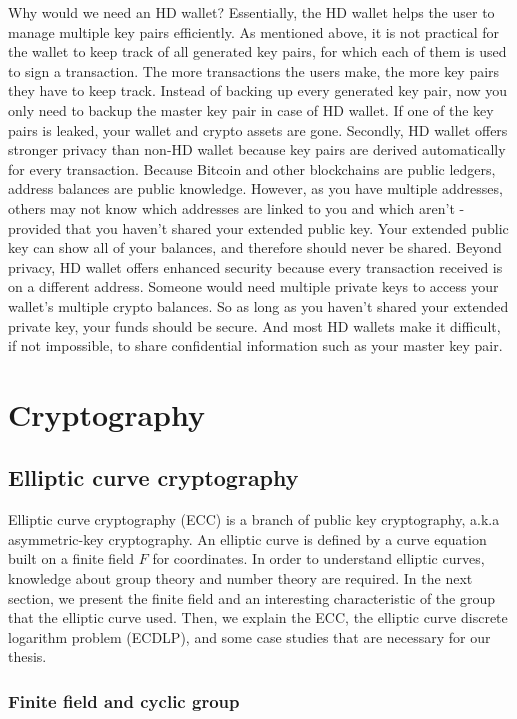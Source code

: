Why would we need an HD wallet? Essentially, the HD wallet helps the user to manage multiple key pairs efficiently. As mentioned above, it is not practical for the wallet to keep track of all generated key pairs, for which each of them is used to sign a transaction. The more transactions the users make, the more key pairs they have to keep track. Instead of backing up every generated key pair, now you only need to backup the master key pair in case of HD wallet. If one of the key pairs is leaked, your wallet and crypto assets are gone. Secondly,  HD wallet offers stronger privacy than non-HD wallet because key pairs are derived automatically for every transaction. Because Bitcoin and other blockchains are public ledgers, address balances are public knowledge. However, as you have multiple addresses, others may not know which addresses are linked to you and which aren’t - provided that you haven’t shared your extended public key. Your extended public key can show all of your balances, and therefore should never be shared. Beyond privacy, HD wallet offers enhanced security because every transaction received is on a different address. Someone would need multiple private keys to access your wallet’s multiple crypto balances. So as long as you haven’t shared your extended private key, your funds should be secure. And most HD wallets make it difficult, if not impossible, to share confidential information such as your master key pair.

\section{Cryptography}
\label{cryptography}

\subsection{Elliptic curve cryptography}

Elliptic curve cryptography (ECC) is a branch of public key cryptography, a.k.a asymmetric-key cryptography. An elliptic curve is defined by a curve equation built on a finite field $F$ for coordinates. In order to understand elliptic curves, knowledge about group theory and number theory are required. In the next section, we present the finite field and an interesting characteristic of the group that the elliptic curve used. Then, we explain the ECC, the elliptic curve discrete logarithm problem (ECDLP), and some case studies that are necessary for our thesis.

\subsubsection{Finite field and cyclic group}

